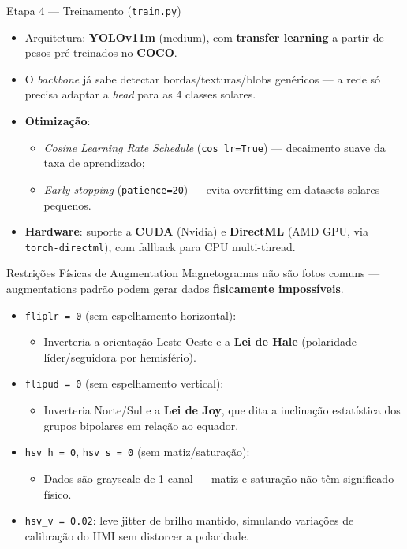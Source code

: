 \documentclass[aspectratio=169]{beamer}
\begin{document}
\begin{frame}{Etapa 4 — Treinamento (\texttt{train.py})}
  \begin{itemize}
    \item Arquitetura: \textbf{YOLOv11m} (medium), com \textbf{transfer learning} a partir de pesos pré-treinados no \textbf{COCO}.
    \item O \emph{backbone} já sabe detectar bordas/texturas/blobs genéricos — a rede só precisa adaptar a \emph{head} para as 4 classes solares.
    \item \textbf{Otimização}:
    \begin{itemize}
      \item \emph{Cosine Learning Rate Schedule} (\texttt{cos\_lr=True}) — decaimento suave da taxa de aprendizado;
      \item \emph{Early stopping} (\texttt{patience=20}) — evita overfitting em datasets solares pequenos.
    \end{itemize}
    \item \textbf{Hardware}: suporte a \textbf{CUDA} (Nvidia) e \textbf{DirectML} (AMD GPU, via \texttt{torch-directml}), com fallback para CPU multi-thread.
  \end{itemize}
\end{frame}

\begin{frame}{Restrições Físicas de Augmentation}
  Magnetogramas não são fotos comuns — augmentations padrão podem gerar dados \textbf{fisicamente impossíveis}.
  \begin{itemize}
    \item \texttt{fliplr = 0} (sem espelhamento horizontal):
    \begin{itemize}
      \small \item Inverteria a orientação Leste-Oeste e a \textbf{Lei de Hale} (polaridade líder/seguidora por hemisfério).
    \end{itemize}
    \item \texttt{flipud = 0} (sem espelhamento vertical):
    \begin{itemize}
      \small \item Inverteria Norte/Sul e a \textbf{Lei de Joy}, que dita a inclinação estatística dos grupos bipolares em relação ao equador.
    \end{itemize}
    \item \texttt{hsv\_h = 0}, \texttt{hsv\_s = 0} (sem matiz/saturação):
    \begin{itemize}
      \small \item Dados são grayscale de 1 canal — matiz e saturação não têm significado físico.
    \end{itemize}
    \item \texttt{hsv\_v = 0.02}: leve jitter de brilho mantido, simulando variações de calibração do HMI sem distorcer a polaridade.
  \end{itemize}
\end{frame}
\end{document}
